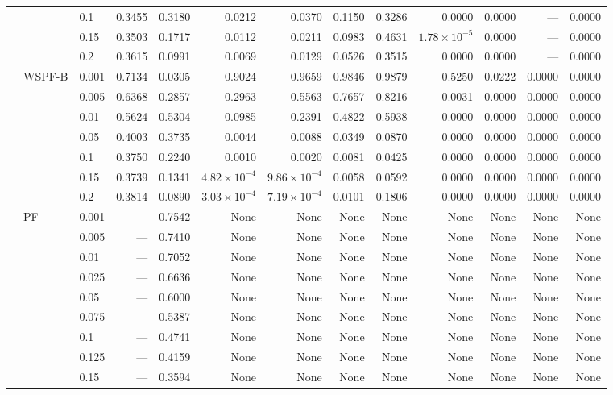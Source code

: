 {\begin{longtable}{@{}lllrrrrrrrrrr@{}}
 &  & 0.1 & 0.3455 & 0.3180 & 0.0212 & 0.0370 & 0.1150 & 0.3286 & 0.0000 & 0.0000 & --- & 0.0000 \\
 &  & 0.15 & 0.3503 & 0.1717 & 0.0112 & 0.0211 & 0.0983 & 0.4631 & $1.78\times 10^{-5}$ & 0.0000 & --- & 0.0000 \\
 &  & 0.2 & 0.3615 & 0.0991 & 0.0069 & 0.0129 & 0.0526 & 0.3515 & 0.0000 & 0.0000 & --- & 0.0000 \\
 & WSPF-B & 0.001 & 0.7134 & 0.0305 & 0.9024 & 0.9659 & 0.9846 & 0.9879 & 0.5250 & 0.0222 & 0.0000 & 0.0000 \\
 &  & 0.005 & 0.6368 & 0.2857 & 0.2963 & 0.5563 & 0.7657 & 0.8216 & 0.0031 & 0.0000 & 0.0000 & 0.0000 \\
 &  & 0.01 & 0.5624 & 0.5304 & 0.0985 & 0.2391 & 0.4822 & 0.5938 & 0.0000 & 0.0000 & 0.0000 & 0.0000 \\
 &  & 0.05 & 0.4003 & 0.3735 & 0.0044 & 0.0088 & 0.0349 & 0.0870 & 0.0000 & 0.0000 & 0.0000 & 0.0000 \\
 &  & 0.1 & 0.3750 & 0.2240 & 0.0010 & 0.0020 & 0.0081 & 0.0425 & 0.0000 & 0.0000 & 0.0000 & 0.0000 \\
 &  & 0.15 & 0.3739 & 0.1341 & $4.82\times 10^{-4}$ & $9.86\times 10^{-4}$ & 0.0058 & 0.0592 & 0.0000 & 0.0000 & 0.0000 & 0.0000 \\
 &  & 0.2 & 0.3814 & 0.0890 & $3.03\times 10^{-4}$ & $7.19\times 10^{-4}$ & 0.0101 & 0.1806 & 0.0000 & 0.0000 & 0.0000 & 0.0000 \\
\midrule
 & PF & 0.001 & --- & 0.7542 & None & None & None & None & None & None & None & None \\
 &  & 0.005 & --- & 0.7410 & None & None & None & None & None & None & None & None \\
 &  & 0.01 & --- & 0.7052 & None & None & None & None & None & None & None & None \\
 &  & 0.025 & --- & 0.6636 & None & None & None & None & None & None & None & None \\
 &  & 0.05 & --- & 0.6000 & None & None & None & None & None & None & None & None \\
 &  & 0.075 & --- & 0.5387 & None & None & None & None & None & None & None & None \\
 &  & 0.1 & --- & 0.4741 & None & None & None & None & None & None & None & None \\
 &  & 0.125 & --- & 0.4159 & None & None & None & None & None & None & None & None \\
 &  & 0.15 & --- & 0.3594 & None & None & None & None & None & None & None & None \\

\end{longtable}}
